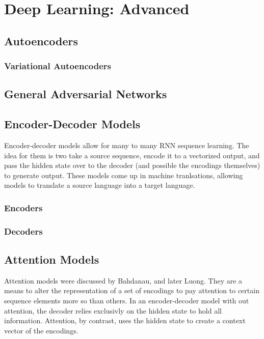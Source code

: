 \section{Deep Learning: Advanced}
\subsection{Autoencoders}
\subsubsection{Variational Autoencoders}
\subsection{General Adversarial Networks}
\subsection{Encoder-Decoder Models}
Encoder-decoder models allow for many to many RNN sequence learning. The idea
for them is two take a source sequence, encode it to a vectorized output, and
pass the hidden state over to the decoder (and possible the encodings themselves)
to generate output. These models come up in machine tranlsations, allowing
models to translate a source language into a target language.
\subsubsection{Encoders}
\subsubsection{Decoders}
\subsection{Attention Models}
Attention models were discussed by Bahdanau, and later Luong. They are a means
to alter the representation of a set of encodings to pay attention to certain
sequence elements more so than others. In an encoder-decoder model with out
attention, the decoder relies exclusivly on the hidden state to hold all
information. Attention, by contrast, uses the hidden state to create a context
vector of the encodings.
